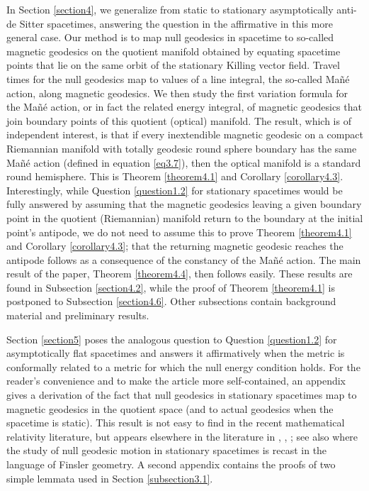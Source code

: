 \documentclass[12pt]{amsart}
\numberwithin{equation}{section}
\begin{document}
In Section \ref{section4}, we generalize from static to stationary asymptotically anti-de Sitter spacetimes, answering the question in the affirmative in this more general case. Our method is to map null geodesics in spacetime to so-called magnetic geodesics on the quotient manifold obtained by equating spacetime points that lie on the same orbit of the stationary Killing vector field. Travel times for the null geodesics map to values of a line integral, the so-called Ma\~n\'e action, along magnetic geodesics. We then study the first variation formula for the Ma\~n\'e action, or in fact the related energy integral, of magnetic geodesics that join boundary points of this quotient (optical) manifold. The result, which is of independent interest, is that if every inextendible magnetic geodesic on a compact Riemannian manifold with totally geodesic round sphere boundary has the same Ma\~n\'e action (defined in equation \eqref{eq3.7}), then the optical manifold is a standard round hemisphere. This is Theorem \ref{theorem4.1} and Corollary \ref{corollary4.3}. Interestingly, while Question \ref{question1.2} for stationary spacetimes would be fully answered by assuming that the magnetic geodesics leaving a given boundary point in the quotient (Riemannian) manifold return to the boundary at the initial point's antipode, we do not need to assume this to prove Theorem \ref{theorem4.1} and Corollary \ref{corollary4.3}; that the returning magnetic geodesic reaches the antipode follows as a consequence of the constancy of the Ma\~n\'e action. The main result of the paper, Theorem \ref{theorem4.4}, then follows easily. These results are found in Subsection \ref{section4.2}, while the proof of Theorem \ref{theorem4.1} is postponed to Subsection \ref{section4.6}. Other subsections contain background material and preliminary results.

Section \ref{section5} poses the analogous question to Question \ref{question1.2} for asymptotically flat spacetimes and answers it affirmatively when the metric is conformally related to a metric for which the null energy condition holds.
For the reader's convenience and to make the article more self-contained, an appendix gives a derivation of the fact that null geodesics in stationary spacetimes map to magnetic geodesics in the quotient space (and to actual geodesics when the spacetime is static). This result is not easy to find in the recent mathematical relativity literature, but appears elsewhere in the literature in \cite{Germinario}, \cite[Section 4.2]{Stefanov}, \cite{OPS}; see also \cite{GHWW09, CaponioJavaloyesMasiello2011, CaponioJavaloyesSanchez2011, CaponioGerminarioSanchez2016,
HerreraJavaloyes2021} where the study of null geodesic motion in stationary spacetimes is recast in the language of Finsler geometry. A second appendix contains the proofs of two simple lemmata used in Section \ref{subsection3.1}.
\end{document}
